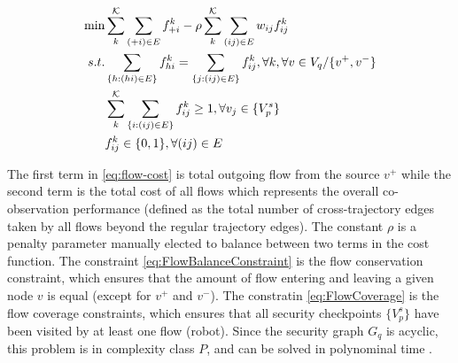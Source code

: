 \documentclass[journal]{IEEEtran}  %
\begin{document}
 \begin{subequations} \label{eq:flow-coverage-problem}
     \begin{align}
        \min & \sum^{\mathcal{K}}_{k} \sum_{(+i)\in E} f^{k}_{+i} - \rho \sum^{\mathcal{K}}_k \sum_{(ij)\in E} w_{ij} f^k_{ij} \label{eq:flow-cost}\\
        s.t. & \sum_{\{h:(hi) \in E\}}f^k_{hi}=\sum_{\{j:(ij) \in E\}}f^k_{ij},  \forall k,\forall v \in V_{q} / \{v^{+}, v^{-}\}  \label{eq:FlowBalanceConstraint}\\
        & \sum^{\mathcal{K}}_k\sum_{\{i:(ij)\in E \}} f^k_{ij} \geq 1, \forall v_{j} \in \{V^{s}_{p}\} \label{eq:FlowCoverage}\\
        & f^k_{ij} \in \{0,1\} ,  \forall (ij)\in E\label{eq:SingleFLowCapacity}
     \end{align}
 \end{subequations}

The first term in \ref{eq:flow-cost} is total outgoing flow from the source $v^{+}$ while the second term is the total cost of all flows which represents the overall co-observation performance (defined as the total number of cross-trajectory edges taken by all flows beyond the regular trajectory edges). The constant $\rho$ is a penalty parameter manually elected to balance between two terms in the cost function. The constraint \eqref{eq:FlowBalanceConstraint} is the flow conservation constraint, which ensures that the amount of flow entering and leaving a given node $v$ is equal (except for $v^{+}$ and $v^{-}$). The constratin \eqref{eq:FlowCoverage} is the flow coverage constraints, which ensures that all security checkpoints $ \{V^{s}_{p}\}$ have been visited by at least one flow (robot). Since the security graph $G_{q}$ is acyclic, this problem is in complexity class $P$, and can be solved in polynominal time \cite{ntafos1979path}. 
\end{document}
